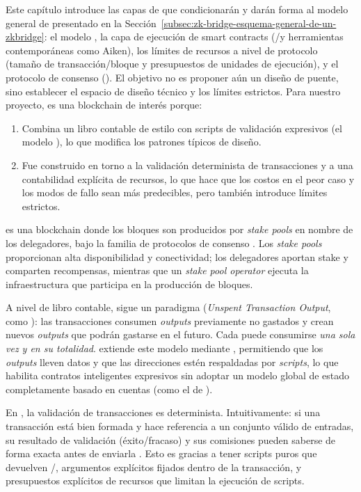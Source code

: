 
Este capítulo introduce las capas de \Cardano que condicionarán y darán forma al modelo general de \zkBridge presentado en la Sección~\ref{subsec:zk-bridge-esquema-general-de-un-zkbridge}: el modelo \eUTxO, la capa de ejecución de smart contracts (\Plutus/\UPLC y herramientas contemporáneas como Aiken), los límites de recursos a nivel de protocolo (tamaño de transacción/bloque y presupuestos de unidades de ejecución), y el protocolo de consenso (\Praos). El objetivo no es proponer aún un diseño de puente, sino establecer el espacio de diseño técnico y los límites estrictos. Para nuestro proyecto, \Cardano es una blockchain de interés porque:

\begin{enumerate}[noitemsep]
	\item Combina un libro contable de estilo \UTxO con scripts de validación expresivos (el modelo \eUTxO), lo que modifica los patrones típicos de diseño.
	\item Fue construido en torno a la validación determinista de transacciones y a una contabilidad explícita de recursos, lo que hace que los costos en el peor caso y los modos de fallo sean más predecibles, pero también introduce límites estrictos.
\end{enumerate}

\Cardano es una blockchain donde los bloques son producidos por \emph{stake pools} en nombre de los delegadores, bajo la familia de protocolos de consenso \Ouroboros. Los \emph{stake pools} proporcionan alta disponibilidad y conectividad; los delegadores aportan stake y comparten recompensas, mientras que un \emph{stake pool operator} ejecuta la infraestructura que participa en la producción de bloques.

A nivel de libro contable, \Cardano sigue un paradigma \UTxO (\emph{Unspent Transaction Output}, como \Bitcoin): las transacciones consumen \textit{outputs} previamente no gastados y crean nuevos \textit{outputs} que podrán gastarse en el futuro. Cada \UTxO puede consumirse \emph{una sola vez y en su totalidad}. \Cardano extiende este modelo mediante \eUTxO, permitiendo que los \textit{outputs} lleven datos y que las direcciones estén respaldadas por \textit{scripts}, lo que habilita contratos inteligentes expresivos sin adoptar un modelo global de estado completamente basado en cuentas (como el de \Ethereum).

En \Cardano, la validación de transacciones es determinista. Intuitivamente: si una transacción está bien formada y hace referencia a un conjunto válido de entradas, su resultado de validación (éxito/fracaso) y sus comisiones pueden saberse de forma exacta antes de enviarla \Onchain. Esto es gracias a tener scripts puros que devuelven \True/\False, argumentos explícitos fijados dentro de la transacción, y presupuestos explícitos de recursos que limitan la ejecución de scripts.

